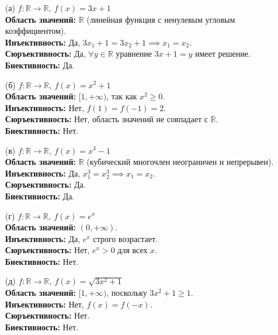 \documentclass[12pt]{article}
\begin{document}
\begin{enumerate}
    \item[(а)] $f : \mathbb{R} \to \mathbb{R},\ f(x) = 3x + 1$ \\
    \textbf{Область значений:} $\mathbb{R}$ (линейная функция с ненулевым угловым коэффициентом). \\
    \textbf{Инъективность:} Да, $3x_1 + 1 = 3x_2 + 1 \implies x_1 = x_2$. \\
    \textbf{Сюръективность:} Да, $\forall y \in \mathbb{R}$ уравнение $3x + 1 = y$ имеет решение. \\
    \textbf{Биективность:} Да.

    \item[(б)] $f : \mathbb{R} \to \mathbb{R},\ f(x) = x^2 + 1$ \\
    \textbf{Область значений:} $[1, +\infty)$, так как $x^2 \ge 0$. \\
    \textbf{Инъективность:} Нет, $f(1) = f(-1) = 2$. \\
    \textbf{Сюръективность:} Нет, область значений не совпадает с $\mathbb{R}$. \\
    \textbf{Биективность:} Нет.

    \item[(в)] $f : \mathbb{R} \to \mathbb{R},\ f(x) = x^3 - 1$ \\
    \textbf{Область значений:} $\mathbb{R}$ (кубический многочлен неограничен и непрерывен). \\
    \textbf{Инъективность:} Да, $x_1^3 = x_2^3 \implies x_1 = x_2$. \\
    \textbf{Сюръективность:} Да. \\
    \textbf{Биективность:} Да.

    \item[(г)] $f : \mathbb{R} \to \mathbb{R},\ f(x) = e^x$ \\
    \textbf{Область значений:} $(0, +\infty)$. \\
    \textbf{Инъективность:} Да, $e^x$ строго возрастает. \\
    \textbf{Сюръективность:} Нет, $e^x > 0$ для всех $x$. \\
    \textbf{Биективность:} Нет.

    \item[(д)] $f : \mathbb{R} \to \mathbb{R},\ f(x) = \sqrt{3x^2 + 1}$ \\
    \textbf{Область значений:} $[1, +\infty)$, поскольку $3x^2 + 1 \ge 1$. \\
    \textbf{Инъективность:} Нет, $f(x) = f(-x)$. \\
    \textbf{Сюръективность:} Нет. \\
    \textbf{Биективность:} Нет.


\end{enumerate}
\end{document}
